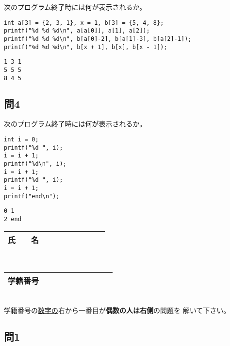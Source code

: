 \documentclass[a4j]{jarticle}
\begin{document}
\begin{multicols*}{2}
次のプログラム終了時には何が表示されるか。
\begin{verbatim}
int a[3] = {2, 3, 1}, x = 1, b[3] = {5, 4, 8};
printf("%d %d %d\n", a[a[0]], a[1], a[2]);
printf("%d %d %d\n", b[a[0]-2], b[a[1]-3], b[a[2]-1]);
printf("%d %d %d\n", b[x + 1], b[x], b[x - 1]);
\end{verbatim}

\ifnum {}
\vspace*{1.5cm}
\else
\begin{verbatim}
1 3 1
5 5 5
8 4 5
\end{verbatim}
\fi



\subsection*{問4}

次のプログラム終了時には何が表示されるか。
\begin{verbatim}
int i = 0;
printf("%d ", i);
i = i + 1;
printf("%d\n", i);
i = i + 1;
printf("%d ", i);
i = i + 1;
printf("end\n");
\end{verbatim}

\ifnum {}
\vspace{1.5cm}
\else
\begin{verbatim}
0 1
2 end
\end{verbatim}\vspace{2cm}
\fi


\vfill

\mbox{}





\noindent
\begin{tabular}[t]{|c|cccccccc|}\hline
氏　　名 & & & & & & & & \\ \hline
\end{tabular}\\
\begin{tabular}[t]{|c|c|c|c|c|c|c|c|c|c|}\hline
学籍番号 & & & & & & & & \\ \hline
\end{tabular}\\
学籍番号の\underline{数字の}右から一番目が{\bfseries 偶数の人は右側}の問題を
解いて下さい。
\vspace{-5ex}





\subsection*{問1}


\end{multicols*}
\end{document}
